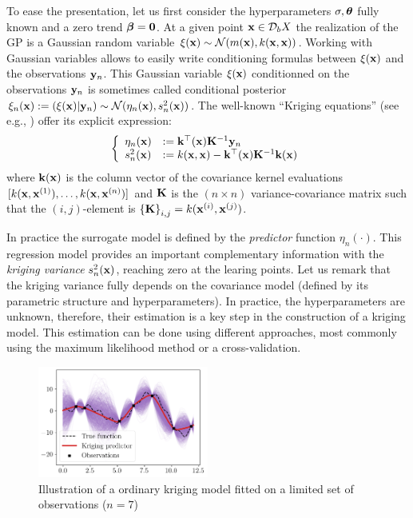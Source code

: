 To ease the presentation, let us first consider the hyperparameters $\sigma, {\boldsymbol{\theta}}$ fully known and a zero trend ${\boldsymbol{\beta}} = \textbf{0}$.
At a given point ${\bf x} \in \mathcal{D}_bX$ the realization of the GP is a Gaussian random variable $\xi({\bf x}) \sim \mathcal{N}(m({\bf x}), k({\bf x}, {\bf x}))$. 
Working with Gaussian variables allows to easily write conditioning formulas between $\xi({\bf x})$ and the observations ${\bf y}_n$.
This Gaussian variable $\xi({\bf x})$ conditionned on the observations ${\bf y}_n$ is sometimes called conditional posterior $\xi_n({\bf x}) := (\xi({\bf x}) | {\bf y}_n) \sim \mathcal{N}(\eta_n({\bf x}), s_n^2({\bf x}))$. 
The well-known ``Kriging equations'' (see e.g., \cite{rasmussen_2006}) offer its explicit expression:
\begin{equation}
    \left\{
    \begin{array}{ll}
        \eta_n({\bf x}) &:= {\bf k}^\top({\bf x}) {\bf K}^{-1} {\bf y}_n\\
        s_n^2({\bf x}) &:= k({\bf x}, {\bf x}) - {\bf k}^\top({\bf x}) {\bf K}^{-1} {\bf k}({\bf x})
    \end{array}
\right.
\label{eq:kriging}
\end{equation}
where ${\bf k}({\bf x})$ is the column vector of the covariance kernel evaluations $[k({\bf x}, {\bf x}^{(1)}), \dots,\allowbreak k({\bf x}, {\bf x}^{(n)})]$ and ${\bf K}$ is the $(n \times n)$ 
variance-covariance matrix such that the $(i, j)$-element is $\left\{{\bf K} \right\}_{i, j}=k({\bf x}^{(i)}, {\bf x}^{(j)})$.

In practice the surrogate model is defined by the \textit{predictor} function $\eta_n(\cdot)$. 
This regression model provides an important complementary information with the \textit{kriging variance} $s_n^2({\bf x})$, reaching zero at the learing points.
Let us remark that the kriging variance fully depends on the covariance model (defined by its parametric structure and hyperparameters). 
In practice, the hyperparameters are unknown, therefore, their estimation is a key step in the construction of a kriging model. 
This estimation can be done using different approaches, most commonly using the maximum likelihood method or a cross-validation.


\begin{figure}[ht]
    \centering
    \includegraphics[width=0.5\textwidth]{../numerical_experiments/chapter1/figures/kriging_1D.png}
    \caption{Illustration of a ordinary kriging model fitted on a limited set of observations ($n=7$)}
    \label{fig:kriging_1D}
\end{figure}



